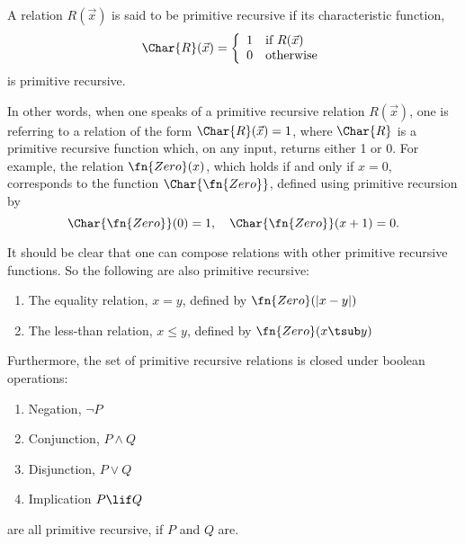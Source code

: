 \documentclass[../../include/open-logic-section]{subfiles}
\begin{document}


\begin{defn}
A relation $R(\vec x)$ is said to be primitive recursive if its characteristic
function,
\[
\Char{R}(\vec x) = \left\{
  \begin{array}{ll}
  1 & \mbox{if $R(\vec x)$} \\
  0 & \mbox{otherwise} 
  \end{array}
\right.
\]
is primitive recursive. 
\end{defn}

In other words, when one speaks of a primitive
recursive relation $R(\vec x)$, one is referring to a relation of the
form $\Char{R}(\vec x) = 1$, where $\Char{R}$ is a primitive recursive
function which, on any input, returns either 1 or 0. For example, the
relation $\fn{Zero}(x)$, which holds if and only if $x = 0$,
corresponds to the function $\Char{\fn{Zero}}$, defined using primitive
recursion by 
\[
\Char{\fn{Zero}}(0) = 1, \quad \Char{\fn{Zero}}(x+1) = 0.
\]

It should be clear that one can compose relations with other primitive
recursive functions. So the following are also primitive recursive:
\begin{enumerate}
\item The equality relation, $x = y$, defined by $\fn{Zero}(\left|x -
  y\right|)$
\item The less-than relation, $x \leq y$, defined by $\fn{Zero}(x
  \tsub y)$
\end{enumerate}
Furthermore, the set of primitive recursive relations is closed under
boolean operations:
\begin{enumerate}
\item Negation, $\lnot P$
\item Conjunction, $P \land Q$
\item Disjunction, $P \lor Q$
\item Implication $P \lif Q$
\end{enumerate}
are all primitive recursive, if $P$ and $Q$ are.
\end{document}
